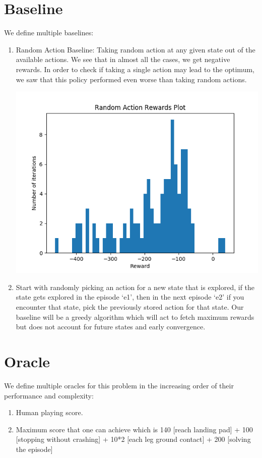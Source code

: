 \documentclass[12pt]{article}
\begin{document}
\section{Baseline}
We define multiple baselines:
\begin{enumerate}[label=(\alph*)]
\item 
\noindent\begin{minipage}{0.6\textwidth}
Random Action Baseline: Taking random action at any given state out of the available actions. We see that in almost all the cases, we get negative rewards. In order to check if taking a single action may lead to the optimum, we saw that this policy performed even worse than taking random actions.
\end{minipage}
\begin{minipage}{0.3\textwidth}\raggedleft
\includegraphics[scale=0.3]{images/random-action-reward-plot.png}
\end{minipage}
\item Start with randomly picking an action for a new state that is explored, if the state gets explored in the episode ‘e1’, then in the next episode ‘e2’ if you encounter that state, pick the previously stored action for that state. Our baseline will be a greedy algorithm which will act to  fetch maximum rewards but does not account for future states and early convergence.
\end{enumerate}


\section{Oracle}
We define multiple oracles for this problem in the increasing order of their performance and complexity:
\begin{enumerate}[label=(\alph*)]
\item Human playing score.
\item Maximum score that one can achieve which is 140 [reach landing pad]  + 100 [stopping without crashing] + 10*2 [each leg ground contact] + 200 [solving the episode]
\end{enumerate}
\end{document}
